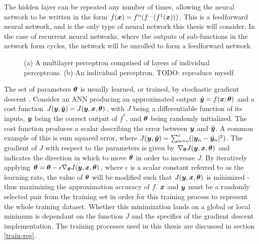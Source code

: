 The hidden layer can be repeated any number of times, allowing the neural network to be written in the form $f({\bm{x}}) = f^n(f^{\ldots}(f^1({\bm{x}})))$.
This is a feedforward neural network, and is the only type of neural network this thesis will consider.
In the case of recurrent neural networks, where the outputs of sub-functions in the network form cycles, the network will be unrolled to form a feedforward network.
\begin{figure}[htbp]
	\centering
	\quad\quad
	\caption{(a) A multilayer perceptron comprised of layers of individual perceptrons. (b) An individual perceptron. TODO: reproduce myself}
	\label{fig:simple-ann}
\end{figure}

The set of parameters ${\bm{\theta}}$ is usually learned, or trained, by stochastic gradient descent \citep{Bottou2011}.
Consider an ANN producing an approximated output $\hat{{\bm{y}}} = f({\bm{x}}; {\bm{\theta}})$ and a cost function $J({\bm{y}}, \hat{{\bm{y}}}) = J({\bm{y}}, {\bm{x}}, {\bm{\theta}})$, with  $J$ being a differentiable function of its inputs, ${\bm{y}}$ being the correct output of $f^*$, and ${\bm{\theta}}$ being randomly initialized.
The cost function produces a scalar describing the error between ${\bm{y}}$ and $\hat{{\bm{y}}}$.
A common example of this is sum squared error, where $J({\bm{y}}, \hat{{\bm{y}}}) = \sum_{n=o}^{i}(|{\bm{y}}_n - \hat{{\bm{y}}}_n|^2)$.
The gradient of $J$ with respect to the parameters is given by $\nabla_{{\bm{\theta}}}J({\bm{y}}, {\bm{x}}, {\bm{\theta}})$ and indicates the direction in which to move ${\bm{\theta}}$ in order to increase $J$.
By iteratively applying ${\bm{\theta}} = {\bm{\theta}} - \epsilon \nabla_{{\bm{\theta}}}J({\bm{y}}, {\bm{x}}, {\bm{\theta}})$, where $\epsilon$ is a scalar constant referred to as the learning rate, the value of ${\bm{\theta}}$ will be modified such that $J({\bm{y}}, {\bm{x}}, {\bm{\theta}})$ is minimized - thus maximizing the approximation accuracy of $f$.
${\bm{x}}$ and ${\bm{y}}$ must be a randomly selected pair from the training set in order for this training process to represent the whole training dataset.
Whether this minimization lands on a global or local minimum is dependant on the function $J$ and the specifics of the gradient descent implementation.
The training processes used in this thesis are discussed in section \ref{train-reg}.


